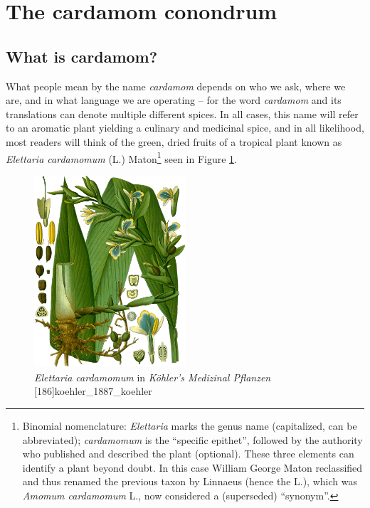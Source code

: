 \documentclass[12pt]{article}
\begin{document}
\section{The cardamom conondrum}\label{sec:plants}

\subsection{What is cardamom?}


What people mean by the name \textit{cardamom} depends on who we ask, where we are, and in what language we are operating -- for the word \textit{cardamom} and its translations can denote multiple different spices. In all cases, this name will refer to an aromatic plant yielding a culinary and medicinal spice, and in all likelihood, most readers will think of the green, dried fruits of a tropical plant known as \textit{Elettaria cardamomum} (L.) Maton\footnote{Binomial nomenclature: \textit{Elettaria} marks the genus name (capitalized, can be abbreviated); \textit{cardamomum} is the ``specific epithet'', followed by the authority who published and described the plant (optional). These three elements can identify a plant beyond doubt. In this case William George Maton reclassified and thus renamed the previous taxon by Linnaeus (hence the L.), which was \textit{Amomum cardamomum} L., now considered a (superseded) ``synonym''.} seen in Figure \ref{fig:cardamom}.


\begin{figure}
    \centering
    \includegraphics[width=0.5\textwidth]{imgs/cardamom.png}
    \caption{\textit{Elettaria cardamomum} in \textit{Köhler's Medizinal Pflanzen} [186]{koehler_1887_koehler}}
    \label{fig:cardamom}
\end{figure}
\end{document}
